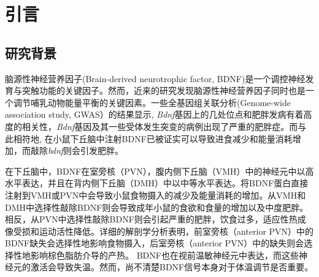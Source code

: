 \chapter{引言}\label{chap:introduction}

\section{研究背景}
脑源性神经营养因子(Brain-derived neurotrophic factor, BDNF)是一个调控神经发育与突触功能的关键因子。然而，近来的研究发现脑源性神经营养因子同时也是一个调节哺乳动物能量平衡的关键因素\citep{xu2016neurotrophic}。一些全基因组关联分析(Genome-wide association study, GWAS）的结果显示, \textit{Bdnf}基因上的几处位点和肥胖发病有着高度的相关性\citep{thorleifsson2009genome,speliotes2010association,wen2012meta}，\textit{Bdnf}基因及其一些受体发生突变的病例出现了严重的肥胖症\citep{gray2006hyperphagia}。而与此相符地, 在小鼠下丘脑中注射BDNF已被证实可以导致进食减少和能量消耗增加\citep{wang2007abrain,wang2007bbrain,wang2010brain,godar2011reduction}，而敲除\textit{bdnf}则会引发肥胖\citep{xu2003brain, unger2007selective, liao2012dendritically}。

在下丘脑中，BDNF在室旁核（PVN），腹内侧下丘脑（VMH）中的神经元中以高水平表达，并且在背内侧下丘脑（DMH）中以中等水平表达\citep{xu2003brain, unger2007selective, liao2012dendritically, an2015discrete}。将BDNF蛋白直接注射到VMH或PVN中会导致小鼠食物摄入的减少及能量消耗的增加\citep{wang2007abrain,wang2007bbrain,godar2011reduction}。从VMH和DMH中选择性敲除BDNF则会导致成年小鼠的食欲和食量的增加以及中度肥胖\citep{unger2007selective}。相反，从PVN中选择性敲除BDNF则会引起严重的肥胖，饮食过多，适应性热成像受损和运动活性降低\citep{an2015discrete}。详细的解剖学分析表明，前室旁核（anterior PVN）中的BDNF缺失会选择性地影响食物摄入，后室旁核（anterior PVN）中的缺失则会选择性地影响棕色脂肪介导的产热\citep{an2015discrete}。 BDNF也在视前温敏神经元中表达\citep{tan2016warm, zhao2017hypothalamic}，而这些神经元的激活会导致失温\citep{tan2016warm}。然而，尚不清楚BDNF信号本身对于体温调节是否重要。

